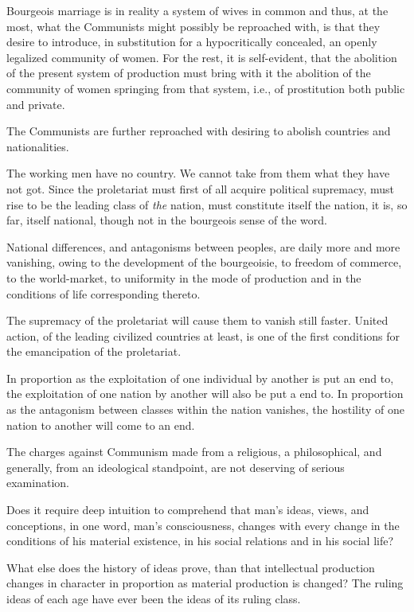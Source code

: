 Bourgeois marriage is in reality a system of wives in common and thus, at the most, what the Communists might possibly be reproached with, is that they desire to introduce, in substitution for a hypocritically concealed, an openly legalized community of women. For the rest, it is self-evident, that the abolition of the present system of production must bring with it the abolition of the community of women springing from that system, i.e., of prostitution both public and private.

The Communists are further reproached with desiring to abolish countries and nationalities.

The working men have no country. We cannot take from them what they have not got. Since the proletariat must first of all acquire political supremacy, must rise to be the leading class of \emph{the} nation, must constitute itself the nation, it is, so far, itself national, though not in the bourgeois sense of the word.

National differences, and antagonisms between peoples, are daily more and more vanishing, owing to the development of the bourgeoisie, to freedom of commerce, to the world-market, to uniformity in the mode of production and in the conditions of life corresponding thereto.

The supremacy of the proletariat will cause them to vanish still faster. United action, of the leading civilized countries at least, is one of the first conditions for the emancipation of the proletariat.

In proportion as the exploitation of one individual by another is put an end to, the exploitation of one nation by another will also be put a end to. In proportion as the antagonism between classes within the nation vanishes, the hostility of one nation to another will come to an end.

The charges against Communism made from a religious, a philosophical, and generally, from an ideological standpoint, are not deserving of serious examination.

Does it require deep intuition to comprehend that man's ideas, views, and conceptions, in one word, man's consciousness, changes with every change in the conditions of his material existence, in his social relations and in his social life?

What else does the history of ideas prove, than that intellectual production changes in character in proportion as material production is changed? The ruling ideas of each age have ever been the ideas of its ruling class.

